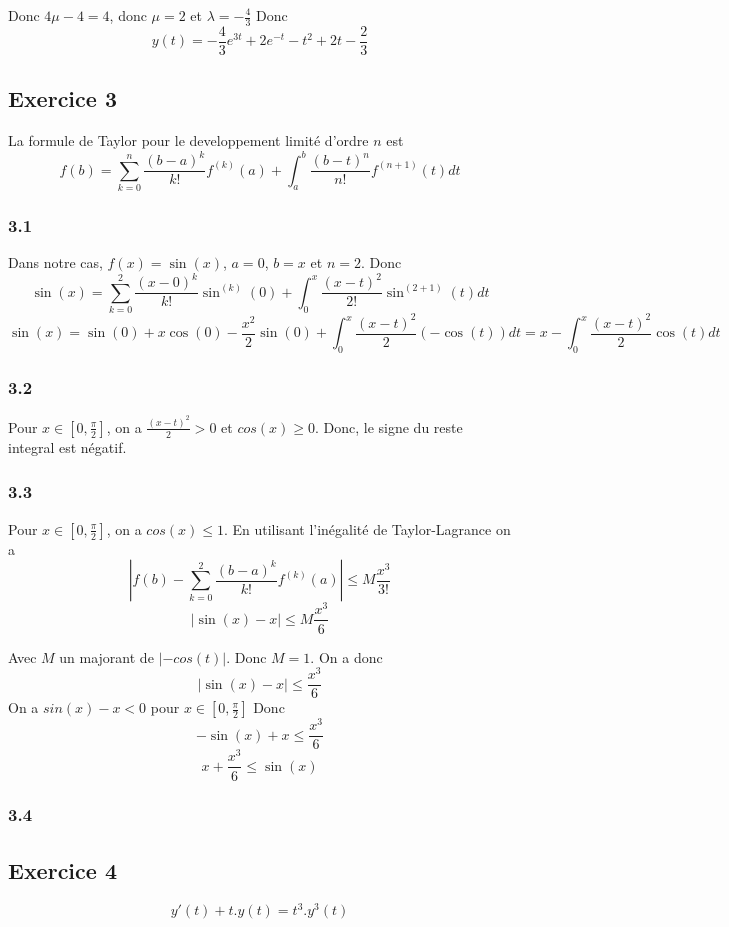 \documentclass[]{book}
\theoremstyle{definition}
\begin{document}
Donc $4\mu - 4 = 4$, donc $\mu = 2$ et $\lambda = -\frac{4}{3}$
Donc
$$y(t) = -\frac{4}{3}e^{3t} + 2 e^{-t} -t^2 + 2t -\frac{2}{3}$$



\subsection*{Exercice 3}
La formule de Taylor pour le developpement limit\'e d'ordre $n$ est
$$f(b) = \sum_{k=0}^n{\frac{(b-a)^k}{k!}f^{(k)}(a)} + \int_a^b{\frac{(b-t)^n}{n!}f^{(n+1)}(t)dt}$$

\subsubsection*{3.1}
Dans notre cas, $f(x) = \sin(x)$, $a = 0$, $b = x$ et $n = 2$.
Donc 
$$\sin(x) = \sum_{k=0}^2{\frac{(x-0)^k}{k!}\sin^{(k)}(0)} + \int_0^x{\frac{(x-t)^2}{2!}\sin^{(2+1)}(t)dt}$$
$$\sin(x) = \sin(0) + x\cos(0) - \frac{x^2}{2}\sin(0) + \int_0^x{\frac{(x-t)^2}{2}(-\cos(t))dt} = x - \int_0^x{\frac{(x-t)^2}{2}\cos(t)dt}$$

\subsubsection*{3.2}
Pour $x \in [0,\frac{\pi}{2}]$, on a $\frac{(x-t)^2}{2} >0$ et $cos(x) \geq 0$. Donc, le signe du reste integral est n\'egatif.

\subsubsection*{3.3}
Pour $x \in [0,\frac{\pi}{2}]$, on a $cos(x) \leq 1$.
En utilisant l'in\'egalit\'e de Taylor-Lagrance on a 
$$|f(b) - \sum_{k=0}^2{\frac{(b-a)^k}{k!}f^{(k)}(a)}| \leq M\frac{x^3}{3!}$$
$$|\sin(x) - x| \leq M\frac{x^3}{6}$$

Avec $M$ un majorant de $|-cos(t)|$. Donc $M=1$.
On a donc 
$$|\sin(x) - x| \leq \frac{x^3}{6}$$
On a $sin(x) - x < 0$ pour $x \in [0,\frac{\pi}{2}]$ Donc
$$-\sin(x) + x \leq \frac{x^3}{6}$$
$$x+\frac{x^3}{6} \leq \sin(x)$$

\subsubsection*{3.4}


\subsection*{Exercice 4}
$$y'(t) + t.y(t) = t^3.y^3(t)$$
\end{document}
